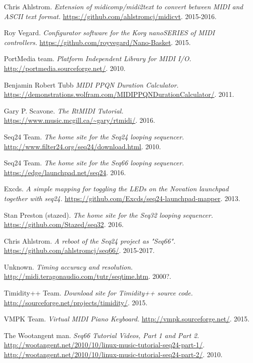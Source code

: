 {\begin{thebibliography}{99}
   Chris Ahlstrom.
   \emph{Extension of midicomp/midi2text to convert between MIDI and ASCII
      text format.}
   \url{https://github.com/ahlstromcj/midicvt}.
   2015-2016.

   Roy Vegard.
   \emph{Configurator software for the Korg nanoSERIES of MIDI controllers.}
   \url{https://github.com/royvegard/Nano-Basket}.
   2015.

   PortMedia team.
   \emph{Platform Independent Library for MIDI I/O.}
   \url{http://portmedia.sourceforge.net/}.
   2010.

   Benjamin Robert Tubb
   \emph{MIDI PPQN Duration Calculator.}
   \url{https://demonstrations.wolfram.com/MIDIPPQNDurationCalculator/}.
   2011.

   Gary P. Scavone.
   \emph{The RtMIDI Tutorial.}
   \url{https://www.music.mcgill.ca/~gary/rtmidi/}.
   2016.

   Seq24 Team.
   \emph{The home site for the Seq24 looping sequencer.}
   \url{http://www.filter24.org/seq24/download.html}.
   2010.

   Seq24 Team.
   \emph{The home site for the Seq66 looping sequencer.}
   \url{https://edge/launchpad.net/seq24}.
   2016.

   Excds.
   \emph{A simple mapping for toggling the LEDs on the Novation launchpad
   together with seq24.}
   \url{https://github.com/Excds/seq24-launchpad-mapper}.
   2013.

   Stan Preston (stazed).
   \emph{The home site for the Seq32 looping sequencer.}
   \url{https://github.com/Stazed/seq32}.
   2016.

   Chris Ahlstrom.
   \emph{A reboot of the Seq24 project as "Seq66".}
   \url{https://github.com/ahlstromcj/seq66/}.
   2015-2017.

   Unknown.
   \emph{Timing accuracy and resolution.}
   \url{http://midi.teragonaudio.com/tutr/seqtime.htm}.
   2000?.

   Timidity++ Team.
   \emph{Download site for Timidity++ source code.}
   \url{http://sourceforge.net/projects/timidity/}.
   2015.

   VMPK Team.
   \emph{Virtual MIDI Piano Keyboard.}
   \url{http://vmpk.sourceforge.net/}.
   2015.

   The Wootangent man.
   \emph{Seq66 Tutorial Videos, Part 1 and Part 2.}
   \url{http://wootangent.net/2010/10/linux-music-tutorial-seq24-part-1/}.
   \url{http://wootangent.net/2010/10/linux-music-tutorial-seq24-part-2/}.
   2010.

\end{thebibliography}
}

